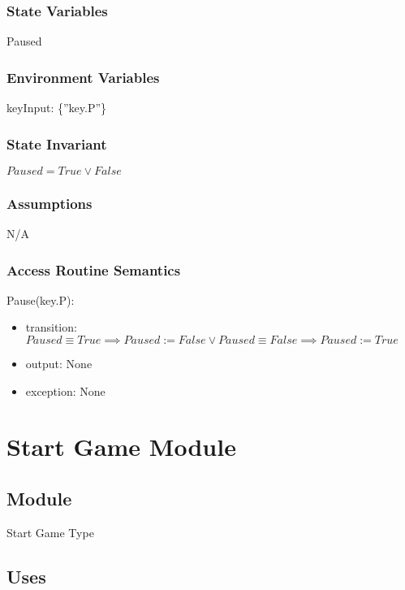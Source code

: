 \documentclass[12pt]{article}
\begin{document}
\subsubsection* {State Variables}
Paused \\
\subsubsection* {Environment Variables}

keyInput: \{”key.P”\}

\subsubsection* {State Invariant}

$Paused = True \lor False $

\subsubsection* {Assumptions}

N/A

\subsubsection* {Access Routine Semantics}

\noindent Pause(key.P):
\begin{itemize}
\item transition: $Paused \equiv True \implies Paused := False \lor Paused \equiv False \implies Paused := True$
\item output: None
\item exception: None
\end{itemize}

\newpage

\section* {Start Game Module}

\subsection*{Module}

Start Game Type

\subsection* {Uses}
\end{document}
